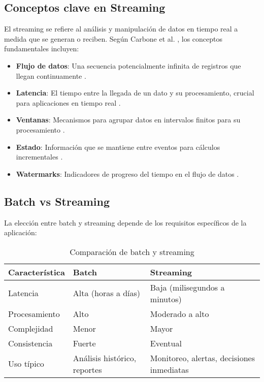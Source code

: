 \subsection{Conceptos clave en Streaming}

El streaming se refiere al análisis y manipulación de datos en tiempo real a medida que se generan o reciben. Según Carbone et al. \parencite{carbone2015apache}, los conceptos fundamentales incluyen:

\begin{itemize}
    \item \textbf{Flujo de datos}: Una secuencia potencialmente infinita de registros que llegan continuamente \parencite{akidau2015dataflow}.
    \item \textbf{Latencia}: El tiempo entre la llegada de un dato y su procesamiento, crucial para aplicaciones en tiempo real \parencite{akidau2015dataflow}.
    \item \textbf{Ventanas}: Mecanismos para agrupar datos en intervalos finitos para su procesamiento \parencite{akidau2015dataflow}.
    \item \textbf{Estado}: Información que se mantiene entre eventos para cálculos incrementales \parencite{carbone2015apache}.
    \item \textbf{Watermarks}: Indicadores de progreso del tiempo en el flujo de datos \parencite{akidau2015dataflow}.
\end{itemize}
\newpage
\subsection{Batch vs Streaming}

La elección entre batch y streaming depende de los requisitos específicos de la aplicación:

\begin{table}[h]
\centering
\begin{tabular}{|p{3cm}|p{5cm}|p{5cm}|}
\hline
\textbf{Característica} & \textbf{Batch} & \textbf{Streaming} \\
\hline
Latencia & Alta (horas a días) & Baja (milisegundos a minutos) \\
\hline
Procesamiento & Alto & Moderado a alto \\
\hline
Complejidad & Menor & Mayor \\
\hline
Consistencia & Fuerte & Eventual \\
\hline
Uso típico & Análisis histórico, reportes & Monitoreo, alertas, decisiones inmediatas \\
\hline
\end{tabular}
\caption{Comparación de batch y streaming}
\label{tab:batch_vs_streaming}
\end{table}

